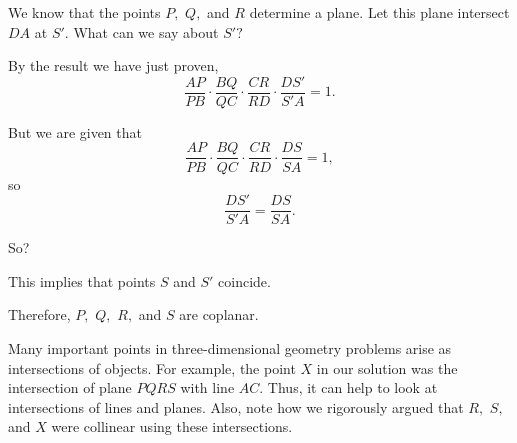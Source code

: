 



We know that the points $P,$ $Q,$ and $R$ determine a plane. Let this plane intersect $DA$ at $S'.$ What can we say about $S'?$


By the result we have just proven,
$$\frac{AP}{PB} \cdot \frac{BQ}{QC} \cdot \frac{CR}{RD} \cdot \frac{DS'}{S'A} = 1.$$

But we are given that
$$\frac{AP}{PB} \cdot \frac{BQ}{QC} \cdot \frac{CR}{RD} \cdot \frac{DS}{SA} = 1,$$
so
$$\frac{DS'}{S'A} = \frac{DS}{SA}.$$

So?






This implies that points $S$ and $S'$ coincide.

Therefore, $P,$ $Q,$ $R,$ and $S$ are coplanar.

\begin{note*}
Many important points in three-dimensional geometry problems arise as intersections of objects. For example, the point $X$ in our solution was the intersection of plane $PQRS$ with line $AC.$ Thus, it can help to look at intersections of lines and planes. Also, note how we rigorously argued that $R,$ $S,$ and $X$ were collinear using these intersections.    
\end{note*}

